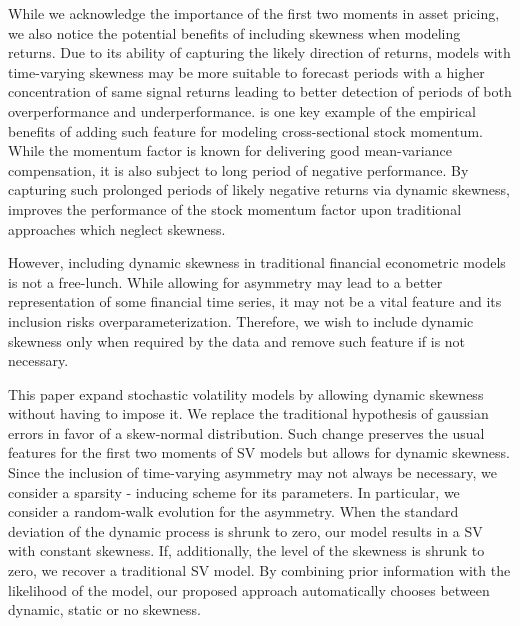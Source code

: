 \documentclass{article}
\begin{document}
While we acknowledge the importance of the first two moments in asset pricing, we also notice the potential benefits of including skewness when modeling returns. Due to its ability of capturing the likely direction of returns, models with time-varying skewness may be more suitable to forecast periods with a higher concentration of same signal returns leading to better detection of periods of both overperformance and underperformance. \cite{bianchi2022taming} is one key example of the empirical benefits of adding such feature for modeling cross-sectional stock momentum. While the momentum factor is known for delivering good mean-variance compensation, it is also subject to long period of negative performance. By capturing such prolonged periods of likely negative returns via dynamic skewness, \cite{bianchi2022taming} improves the performance of the stock momentum factor upon traditional approaches which neglect skewness. 

However, including dynamic skewness in traditional financial econometric models is not a free-lunch. While allowing for asymmetry may lead to a better representation of some financial time series, it may not be a vital feature and its inclusion risks overparameterization. Therefore, we wish to include dynamic skewness only when required by the data and remove such feature if is not necessary. 

This paper expand stochastic volatility models by allowing dynamic skewness without having to impose it. We replace the traditional hypothesis of gaussian errors in favor of a skew-normal distribution. Such change preserves the usual features for the first two moments of SV models but allows for dynamic skewness. Since the inclusion of time-varying asymmetry may not always be necessary, we consider a sparsity - inducing scheme for its parameters. In particular, we consider a random-walk evolution for the asymmetry. When the standard deviation of the dynamic process is shrunk to zero, our model results in a SV with constant skewness. If, additionally, the level of the skewness is shrunk to zero, we recover a traditional SV model. By combining prior information with the likelihood of the model, our proposed approach automatically chooses between dynamic, static or no skewness.  
\end{document}
